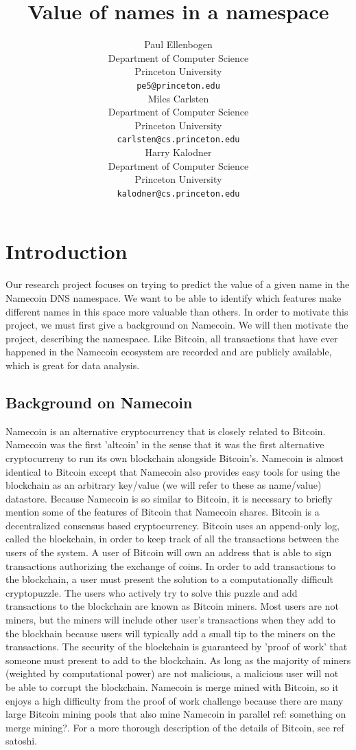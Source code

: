 \documentclass{article} %
\title{Value of names in a namespace}
\author{
Paul Ellenbogen \\
Department of Computer Science\\
Princeton University\\
\texttt{pe5@princeton.edu} \\
\And
Miles Carlsten\\
Department of Computer Science \\
Princeton University\\
\texttt{carlsten@cs.princeton.edu} \\
\And
Harry Kalodner\\
Department of Computer Science \\
Princeton University\\
\texttt{kalodner@cs.princeton.edu} \\
}
\begin{document}
\maketitle

\begin{abstract}
\end{abstract}

\section{Introduction}
    Our research project focuses on trying to predict the value of a given name in the Namecoin DNS namespace. We want to be able to identify which features make different names in this space more valuable than others. In order to motivate this project, we must first give a background on Namecoin. We will then motivate the project, describing the namespace. Like Bitcoin, all transactions that have ever happened in the Namecoin ecosystem are recorded and are publicly available, which is great for data analysis.

\subsection{Background on Namecoin}
    Namecoin is an alternative cryptocurrency that is closely related to Bitcoin. Namecoin was the first 'altcoin' in the sense that it was the first alternative cryptocurreny to run its own blockchain alongside Bitcoin's. Namecoin is almost identical to Bitcoin except that Namecoin also provides easy tools for using the blockchain as an arbitrary key/value (we will refer to these as name/value) datastore. Because Namecoin is so similar to Bitcoin, it is necessary to briefly mention some of the features of Bitcoin that Namecoin shares. Bitcoin is a decentralized consensus based cryptocurrency. Bitcoin uses an append-only log, called the blockchain, in order to keep track of all the transactions between the users of the system. A user of Bitcoin will own an address that is able to sign transactions authorizing the exchange of coins. In order to add transactions to the blockchain, a user must present the solution to a computationally difficult cryptopuzzle. The users who actively try to solve this puzzle and add transactions to the blockchain are known as Bitcoin miners. Most users are not miners, but the miners will include other user's transactions when they add to the blockhain because users will typically add a small tip to the miners on the transactions. The security of the blockchain is guaranteed by 'proof of work' that someone must present to add to the blockchain. As long as the majority of miners (weighted by computational power) are not malicious, a malicious user will not be able to corrupt the blockchain. Namecoin is merge mined with Bitcoin, so it enjoys a high difficulty from the proof of work challenge because there are many large Bitcoin mining pools that also mine Namecoin in parallel {ref: something on merge mining?}. For a more thorough description of the details of Bitcoin, see {ref satoshi}.
    
\end{document}
